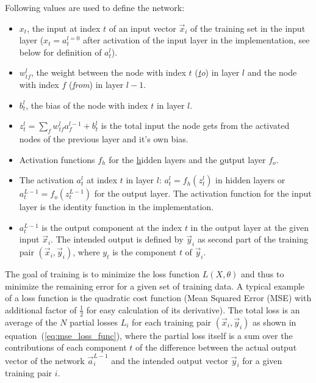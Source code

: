 Following values are used to define the network:
\begin{itemize}
    \item $x_t$, the input at index $t$ of an input vector $\vec{x}_i$ of the training set
    in the input layer ($x_t = a^{l=0}_t$ after activation of the input layer in the
    implementation, see below for definition of $a^l_t$).

    \item $w^l_{tf}$, the weight between the node with index $t$ (\emph{\underline{t}o})
    in layer $l$ and the node with index $f$ (\emph{\underline{f}rom}) in layer $l-1$.

    \item $b^l_t$, the bias of the node with index $t$ in layer $l$.
    
    \item $z^l_t = \sum_{f}{w^l_{tf} a^{l-1}_f} + b^l_t$ is the total input the node gets
    from the activated nodes of the previous layer and it's own bias.
    
    \item Activation functions $f_h$ for the \underline{h}idden layers and the
    \underline{o}utput layer $f_o$.
    
    \item The activation $a^l_t$ at index $t$ in layer $l$: $a^l_t = f_h(z^l_t)$ in hidden
    layers or $a^{L-1}_t = f_o(z^{L-1}_t)$ for the output layer. The activation function
    for the input layer is the identity function in the implementation.

    \item $a^{L-1}_t$ is the output component at the index $t$ in the output layer at the
    given input $\vec{x}_i$. The intended output is defined by $\vec{y}_i$ as second part
    of the training pair $(\vec{x}_i, \vec{y}_i)$, where $y_t$ is the component $t$ of
    $\vec{y}_i$.
\end{itemize}

The goal of training is to minimize the loss function $L(X,\theta)$ and thus to minimize
the remaining error for a given set of training data.  A typical example of a loss
function is the quadratic cost function (Mean Squared Error (MSE) with additional factor
of $\frac{1}{2}$ for easy calculation of its derivative). The total loss is an average of
the $N$ partial losses $L_i$ for each training pair $(\vec{x}_i, \vec{y}_i)$ as shown in
equation~(\ref{eq:mse_loss_func}), where the partial loss itself is a sum over the
contributions of each component $t$ of the difference between the actual output vector of
the network $\vec{a}^{L-1}_i$ and the intended output vector $\vec{y}_i$ for a given
training pair $i$.

